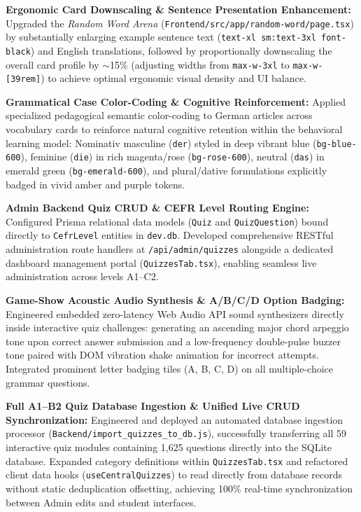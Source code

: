 \documentclass[12pt,a4paper]{article}
\begin{document}
\begin{description}[style=multiline, leftmargin=2.5cm, font=\bfseries\color{primaryBlue}]
    \item[Phases 54--56] \textbf{Ergonomic Card Downscaling \& Sentence Presentation Enhancement:} Upgraded the \textit{Random Word Arena} (\texttt{Frontend/src/app/random-word/page.tsx}) by substantially enlarging example sentence text (\texttt{text-xl sm:text-3xl font-black}) and English translations, followed by proportionally downscaling the overall card profile by $\sim$15\% (adjusting widths from \texttt{max-w-3xl} to \texttt{max-w-[39rem]}) to achieve optimal ergonomic visual density and UI balance.
    \item[Phases 57--59] \textbf{Grammatical Case Color-Coding \& Cognitive Reinforcement:} Applied specialized pedagogical semantic color-coding to German articles across vocabulary cards to reinforce natural cognitive retention within the behavioral learning model: Nominativ masculine (\texttt{der}) styled in deep vibrant blue (\texttt{bg-blue-600}), feminine (\texttt{die}) in rich magenta/rose (\texttt{bg-rose-600}), neutral (\texttt{das}) in emerald green (\texttt{bg-emerald-600}), and plural/dative formulations explicitly badged in vivid amber and purple tokens.
    \item[Phase 60] \textbf{Admin Backend Quiz CRUD \& CEFR Level Routing Engine:} Configured Prisma relational data models (\texttt{Quiz} and \texttt{QuizQuestion}) bound directly to \texttt{CefrLevel} entities in \texttt{dev.db}. Developed comprehensive RESTful administration route handlers at \texttt{/api/admin/quizzes} alongside a dedicated dashboard management portal (\texttt{QuizzesTab.tsx}), enabling seamless live administration across levels A1--C2.
    \item[Phase 61] \textbf{Game-Show Acoustic Audio Synthesis \& A/B/C/D Option Badging:} Engineered embedded zero-latency Web Audio API sound synthesizers directly inside interactive quiz challenges: generating an ascending major chord arpeggio tone upon correct answer submission and a low-frequency double-pulse buzzer tone paired with DOM vibration shake animation for incorrect attempts. Integrated prominent letter badging tiles (A, B, C, D) on all multiple-choice grammar questions.
    \item[Phase 72] \textbf{Full A1--B2 Quiz Database Ingestion \& Unified Live CRUD Synchronization:} Engineered and deployed an automated database ingestion processor (\texttt{Backend/import\_quizzes\_to\_db.js}), successfully transferring all 59 interactive quiz modules containing 1,625 questions directly into the SQLite database. Expanded category definitions within \texttt{QuizzesTab.tsx} and refactored client data hooks (\texttt{useCentralQuizzes}) to read directly from database records without static deduplication offsetting, achieving 100\% real-time synchronization between Admin edits and student interfaces.

\end{description}
\end{document}
